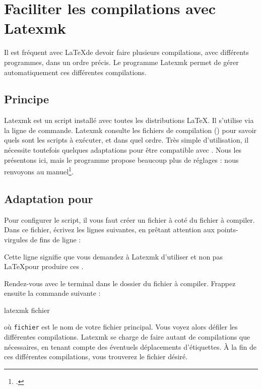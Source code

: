 \chapter{Faciliter les compilations avec Latexmk}\label{latexmk}

\begin{intro}
Il est fréquent avec \LaTeX de devoir faire plusieurs compilations, avec différents programmes, dans un ordre précis. Le programme Latexmk permet de gérer automatiquement ces différentes compilations.
\end{intro}

\section{Principe}

Latexmk est un script installé avec toutes les distributions \LaTeX. Il s'utilise via la ligne de commande.
Latexmk consulte les fichiers de compilation () pour savoir quels sont les scripts à exécuter, et dans quel ordre. 
Très simple d'utilisation, il nécessite toutefois quelques adaptations pour être compatible avec \XeLaTeX. Nous les présentons ici, mais le programme propose beaucoup plus de réglages : nous renvoyons au manuel\footcite{latexmk}.

\section[Adaptation pour XeLaTeX]{Adaptation pour \XeLaTeX}

Pour configurer le script, il vous faut créer un fichier  à coté du fichier à compiler. Dans ce fichier, écrivez les lignes suivantes, en prêtant attention aux points-virgules de fins de ligne  :


Cette ligne signifie que vous demandez à Latexmk d'utiliser \XeLaTeX et non pas \LaTeX pour produire ces .


Rendez-vous avec le terminal dans le dossier du fichier à compiler. Frappez ensuite la commande suivante :
\begin{bashcode}
latexmk fichier
\end{bashcode}

où \verb|fichier| est le nom de votre fichier principal. Vous voyez alors défiler les différentes compilations. Latexmk se charge de faire autant de compilations que nécessaires, en tenant compte des éventuels déplacements d'étiquettes. À la fin de ces différentes compilations, vous trouverez le fichier  désiré.

